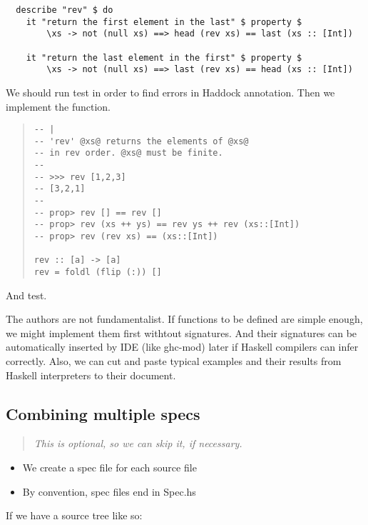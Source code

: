\documentclass[preprint]{sigplanconf}
\begin{document}
\begin{figure*}
\begin{verbatim}
  describe "rev" $ do
    it "return the first element in the last" $ property $
        \xs -> not (null xs) ==> head (rev xs) == last (xs :: [Int])

    it "return the last element in the first" $ property $
        \xs -> not (null xs) ==> last (rev xs) == head (xs :: [Int])
\end{verbatim}
\end{figure*}

\noindent We should run test in order to find errors in Haddock annotation.
Then we implement the function.

\begin{quote}
\begin{verbatim}
-- |
-- 'rev' @xs@ returns the elements of @xs@
-- in rev order. @xs@ must be finite.
-- 
-- >>> rev [1,2,3]
-- [3,2,1]
--
-- prop> rev [] == rev []
-- prop> rev (xs ++ ys) == rev ys ++ rev (xs::[Int])
-- prop> rev (rev xs) == (xs::[Int])

rev :: [a] -> [a]
rev = foldl (flip (:)) []
\end{verbatim}
\end{quote}

\noindent And test.

The authors are not fundamentalist.
If functions to be defined are simple enough,
we might implement them first withtout signatures.
And their signatures can be automatically
inserted by IDE (like ghc-mod) later
if Haskell compilers can infer correctly.
Also, we can cut and paste typical examples and their results
from Haskell interpreters to their document.

\subsection{Combining multiple specs}

\begin{quote}
\emph{This is optional, so we can skip it, if necessary.}
\end{quote}

\begin{itemize}
\item We create a spec file for each source file
\item By convention, spec files end in Spec.hs
\end{itemize}

\noindent If we have a source tree like so:
\end{document}
